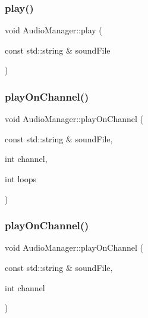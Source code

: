 \mbox{\label{classsage_1_1AudioManager_a09ed800755c7d35a12a889319494b798}} 
\subsubsection{\texorpdfstring{play()}{play()}\hspace{0.1cm}{\footnotesize\ttfamily [2/2]}}
{\footnotesize\ttfamily void Audio\+Manager\+::play (\begin{DoxyParamCaption}\item[{const std\+::string \&}]{sound\+File }\end{DoxyParamCaption})}

\mbox{\label{classsage_1_1AudioManager_a8393c79d76763795c835c0a636a8a8f3}} 
\subsubsection{\texorpdfstring{playOnChannel()}{playOnChannel()}\hspace{0.1cm}{\footnotesize\ttfamily [1/2]}}
{\footnotesize\ttfamily void Audio\+Manager\+::play\+On\+Channel (\begin{DoxyParamCaption}\item[{const std\+::string \&}]{sound\+File,  }\item[{int}]{channel,  }\item[{int}]{loops }\end{DoxyParamCaption})}

\mbox{\label{classsage_1_1AudioManager_a928db254848a8eb2536ba065a0b719d3}} 
\subsubsection{\texorpdfstring{playOnChannel()}{playOnChannel()}\hspace{0.1cm}{\footnotesize\ttfamily [2/2]}}
{\footnotesize\ttfamily void Audio\+Manager\+::play\+On\+Channel (\begin{DoxyParamCaption}\item[{const std\+::string \&}]{sound\+File,  }\item[{int}]{channel }\end{DoxyParamCaption})}

